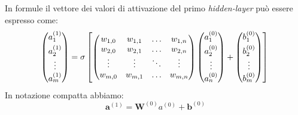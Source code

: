 \documentclass[12pt,a4paper,openright,twoside]{report}
\begin{document}
\newpage
In formule il vettore dei valori di attivazione del primo \emph{hidden-layer} può essere espresso come:
    \begin{equation} 
     \begin{pmatrix}
        a_{1}^{(1)} \\[0.3em]
        a_{2}^{(1)} \\
        \vdots \\
        a_{m}^{(1)}
      \end{pmatrix}
    =
      \sigma \left[ 
      \begin{pmatrix}
        w_{1,0} & w_{1,1} & \ldots & w_{1,n} \\
        w_{2,0} & w_{2,1} & \ldots & w_{2,n} \\
        \vdots  & \vdots  & \ddots & \vdots  \\
        w_{m,0} & w_{m,1} & \ldots & w_{m,n}
      \end{pmatrix}
      {
      \begin{pmatrix}
        a_{1}^{(0)} \\[0.3em]
        a_{2}^{(0)} \\
        \vdots \\
        a_{n}^{(0)}
      \end{pmatrix}}
      +
      \begin{pmatrix}
        b_{1}^{(0)} \\[0.3em]
        b_{2}^{(0)} \\
        \vdots \\
        b_{m}^{(0)}
      \end{pmatrix}\right] 
      \\
    \end{equation}
In notazione compatta abbiamo: 
    \begin{equation}
        \mathbf{a}^{(1)} = \mathbf{W}^{(0)} {a^{(0)}}+\mathbf{b}^{(0)}
    \end{equation}
\end{document}
